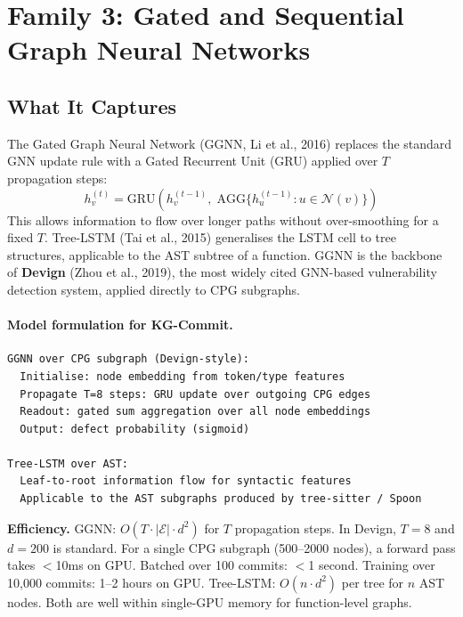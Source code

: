\documentclass[12pt,a4paper]{article}
\begin{document}
\section{Family 3: Gated and Sequential Graph Neural Networks}

\subsection{What It Captures}

The Gated Graph Neural Network (GGNN, Li et al., 2016) replaces the standard
GNN update rule with a Gated Recurrent Unit (GRU) applied over $T$ propagation
steps:
\[
  h_v^{(t)} = \text{GRU}\!\left(h_v^{(t-1)},\;\text{AGG}\{h_u^{(t-1)}: u \in \mathcal{N}(v)\}\right)
\]
This allows information to flow over longer paths without over-smoothing for a
fixed $T$. Tree-LSTM (Tai et al., 2015) generalises the LSTM cell to tree
structures, applicable to the AST subtree of a function. GGNN is the backbone
of \textbf{Devign} (Zhou et al., 2019), the most widely cited GNN-based
vulnerability detection system, applied directly to CPG subgraphs.

\paragraph{Model formulation for KG-Commit.}
\begin{lstlisting}
GGNN over CPG subgraph (Devign-style):
  Initialise: node embedding from token/type features
  Propagate T=8 steps: GRU update over outgoing CPG edges
  Readout: gated sum aggregation over all node embeddings
  Output: defect probability (sigmoid)

Tree-LSTM over AST:
  Leaf-to-root information flow for syntactic features
  Applicable to the AST subgraphs produced by tree-sitter / Spoon
\end{lstlisting}

\begin{effbox}
\textbf{Efficiency.}
GGNN: $O(T \cdot |\mathcal{E}| \cdot d^2)$ for $T$ propagation steps. In Devign,
$T=8$ and $d=200$ is standard. For a single CPG subgraph (500--2000 nodes), a
forward pass takes $<$10ms on GPU. Batched over 100 commits: $<$1 second.
Training over 10,000 commits: 1--2 hours on GPU. Tree-LSTM: $O(n \cdot d^2)$
per tree for $n$ AST nodes. Both are well within single-GPU memory for
function-level graphs.
\end{effbox}
\end{document}
